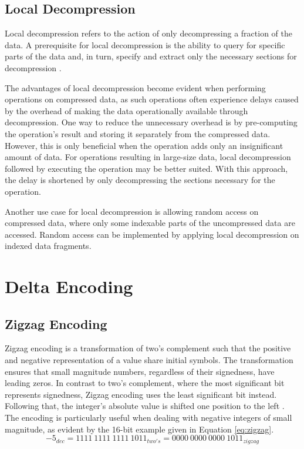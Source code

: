 \subsection{Local Decompression}

Local decompression refers to the action of only decompressing a fraction of the data. A prerequisite for local decompression is the ability to query for specific parts of the data and, in turn, specify and extract only the necessary sections for decompression \cite{localDecomp}.

The advantages of local decompression become evident when performing operations on compressed data, as such operations often experience delays caused by the overhead of making the data operationally available through decompression. One way to reduce the unnecessary overhead is by pre-computing the operation's result and storing it separately from the compressed data. However, this is only beneficial when the operation adds only an insignificant amount of data. For operations resulting in large-size data, local decompression followed by executing the operation may be better suited. With this approach, the delay is shortened by only decompressing the sections necessary for the operation. 

Another use case for local decompression is allowing random access on compressed data, where only some indexable parts of the uncompressed data are accessed. Random access can be implemented by applying local decompression on indexed data fragments.


\section{Delta Encoding}

\subsection{Zigzag Encoding}
Zigzag encoding is a transformation of two's complement such that the positive and negative representation of a value share initial symbols. The transformation ensures that small magnitude numbers, regardless of their signedness, have leading zeros. In contrast to two's complement, where the most significant bit represents signedness, Zigzag encoding uses the least significant bit instead. Following that, the integer's absolute value is shifted one position to the left \cite{zigzagencoding}. The encoding is particularly useful when dealing with negative integers of small magnitude, as evident by the 16-bit example given in Equation \ref{eq:zigzag}. 
\begin{equation}
-5_{dec} = 1111\ 1111\ 1111\ 1011_{two's} = 0000\ 0000\ 0000\ 1011_{zigzag}
\label{eq:zigzag}
\end{equation}

